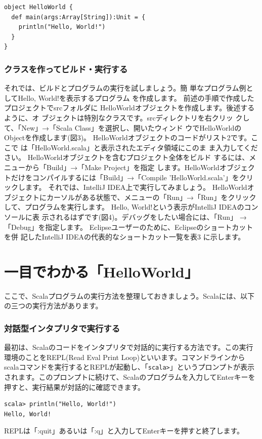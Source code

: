 \documentclass[10pt]{jarticle}
\begin{document}
\begin{lstlisting}[label=src:helloworld, caption=HelloWorld.scala]
object HelloWorld {
  def main(args:Array[String]):Unit = {
    println("Hello, World!")
  }
}
\end{lstlisting}

\section{クラスを作ってビルド・実行する}
それでは、ビルドとプログラムの実行を試しましょう。簡 単なプログラム例としてHello, World!を表示するプログラム を作成します。 前述の手順で作成したプロジェクトでsrcフォルダに HelloWorldオブジェクトを作成します。後述するように、オ ブジェクトは特別なクラスです。srcディレクトリを右クリッ クして、「New」→「Scala Class」を選択し、開いたウィンド ウでHelloWorldのObjectを作成します(図3)。 HelloWorldオブジェクトのコードがリスト2です。ここで は「HelloWorld.scala」と表示されたエディタ領域にこのま ま入力してください。 HelloWorldオブジェクトを含むプロジェクト全体をビルド するには、メニューから「Build」→「Make Project」を指定 します。HelloWorldオブジェクトだけをコンパイルするには「Build」→「Compile 'HelloWorld.scala'」をクリックします。 それでは、IntelliJ IDEA上で実行してみましょう。 HelloWorldオブジェクトにカーソルがある状態で、メニューの「Run」→「Run」をクリックして、プログラムを実行します。 Hello, World!という表示がIntelliJ IDEAのコンソールに表 示されるはずです(図4)。デバッグをしたい場合には、「Run」 →「Debug」を指定します。 Eclipseユーザーのために、Eclipseのショートカットを併 記したIntelliJ IDEAの代表的なショートカット一覧を表3 に示します。

\part{一目でわかる「HelloWorld」}
ここで、Scalaプログラムの実行方法を整理しておきましょう。Scalaには、以下の三つの実行方法があります。 
\setcounter{section}{0}

\section{対話型インタプリタで実行する}
最初は、Scalaのコードをインタプリタで対話的に実行する方法です。この実行環境のことをREPL(Read Eval Print Loop)といいます。コマンドラインからscalaコマンドを実行するとREPLが起動し、「\verb|scala>|」というプロンプトが表示されます。このプロンプトに続けて、Scalaのプログラムを入力してEnterキーを押すと、実行結果が対話的に確認できます。 
\begin{verbatim}
scala> println("Hello, World!")
Hello, World!
\end{verbatim}
REPLは「:quit」あるいは「:q」と入力してEnterキーを押すと終了します。
\end{document}
